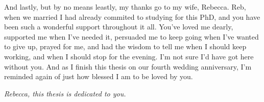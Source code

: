{And lastly, but by no means leastly, my thanks go to my wife, Rebecca. Reb, when we married I had already commited to studying for this PhD, and you have been such a wonderful support throughout it all. You've loved me dearly, supported me when I've needed it, persuaded me to keep going when I've wanted to give up, prayed for me, and had the wisdom to tell me when I should keep working, and when I should stop for the evening. I'm not sure I'd have got here without you. And as I finish this thesis on our fourth wedding anniversary, I'm reminded again of just how blessed I am to be loved by you.

{\it Rebecca, this thesis is dedicated to you.}
}
